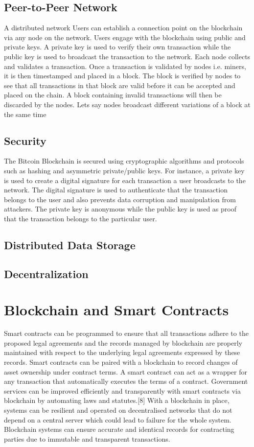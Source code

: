 \documentclass[report]{IEEEtran}
\begin{document}
\subsection{Peer-to-Peer Network}
A distributed network  Users can establish a connection point on the blockchain via any node on the network. Users engage with the blockchain using public and private keys. A private key is used to verify their own transaction while the public key is used to broadcast the transaction to the network. Each node collects and validates a transaction. Once a transaction is validated by nodes i.e. miners, it is then timestamped and placed in a block. The block is verified by nodes to see that all transactions in that block are valid before it can be accepted and placed on the chain. A block containing invalid transactions will then be discarded by the nodes. Lets say nodes broadcast different variations of a block at the same time
\subsection{Security}
The Bitcoin Blockchain is secured using cryptographic algorithms and protocols such as hashing and asymmetric private/public keys. For instance, a private key is used to create a digital signature for each transaction a user broadcasts to the network. The digital signature is used to authenticate that the transaction belongs to the user and also prevents data corruption and manipulation from attackers. The private key is anonymous while the public key is used as proof that the transaction belongs to the particular user. 
\subsection{Distributed Data Storage}
\subsection{Decentralization}

\section{Blockchain and Smart Contracts}
Smart contracts can be programmed to ensure that all transactions adhere to the proposed legal agreements and the records managed by blockchain are properly maintained with respect to the underlying legal agreements expressed by these records. Smart contracts can be paired with a blockchain to record changes of asset ownership under contract terms. A smart contract can act as a wrapper for any transaction that automatically executes the terms of a contract. Government services can be improved efficiently and transparently with smart contracts via blockchain by automating laws and statutes.[8] With a blockchain in place, systems can be resilient and operated on decentralised networks that do not depend on a central server which could lead to failure for the whole system. Blockchain systems can ensure accurate and identical records for contracting parties due to immutable and transparent transactions. 
\end{document}
